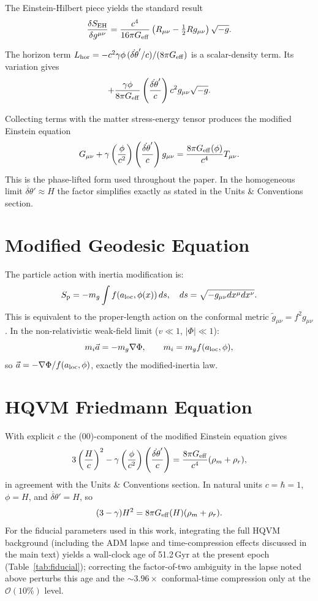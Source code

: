 \documentclass[12pt,a4paper]{article}
\begin{document}
The Einstein-Hilbert piece yields the standard result
\[
\frac{\delta S_{\rm EH}}{\delta g^{\mu\nu}} = \frac{c^4}{16\pi G_{\rm eff}} \left(R_{\mu\nu} - \tfrac12 R g_{\mu\nu}\right) \sqrt{-g}.
\]

The horizon term \(L_{\rm hor} = -c^2\gamma\phi\,(\dot{\delta\theta}'/c)/(8\pi G_{\rm eff})\) is a scalar-density term. Its variation gives
\[
+ \frac{\gamma \phi}{8\pi G_{\rm eff}} \left( \frac{\dot{\delta\theta}'}{c} \right) c^2 g_{\mu\nu} \sqrt{-g}.
\]

Collecting terms with the matter stress-energy tensor produces the modified Einstein equation
\[
G_{\mu\nu} + \gamma \left( \frac{\phi}{c^2} \right) \left( \frac{\dot{\delta\theta}'}{c} \right) g_{\mu\nu} = \frac{8\pi G_{\rm eff}(\phi)}{c^4} T_{\mu\nu}.
\]
This is the phase-lifted form used throughout the paper. In the homogeneous limit \(\dot{\delta\theta}' \approx H\) the factor simplifies exactly as stated in the Units \& Conventions section.

\section{Modified Geodesic Equation}

The particle action with inertia modification is:
\[
S_{\rm p} = -m_g \int f(a_{\rm loc},\phi(x)) \, ds, \quad ds = \sqrt{-g_{\mu\nu} dx^\mu dx^\nu}.
\]
This is equivalent to the proper-length action on the conformal metric $\tilde{g}_{\mu\nu} = f^2 g_{\mu\nu}$. In the non-relativistic weak-field limit ($v \ll 1$, $|\Phi| \ll 1$):
\[
m_i \vec{a} = -m_g \nabla\Phi, \qquad m_i = m_g f(a_{\rm loc},\phi),
\]
so $\vec{a} = -\nabla\Phi / f(a_{\rm loc},\phi)$, exactly the modified-inertia law.

\section{HQVM Friedmann Equation}

With explicit $c$ the (00)-component of the modified Einstein equation gives
\[
3\left(\frac{H}{c}\right)^2 - \gamma\left(\frac{\phi}{c^2}\right)\left(\frac{\dot{\delta\theta}'}{c}\right) = \frac{8\pi G_{\rm eff}}{c^4}(\rho_m + \rho_r),
\]
in agreement with the Units \& Conventions section. In natural units $c = \hbar = 1$, $\phi = H$, and $\dot{\delta\theta}' = H$, so
\[
(3-\gamma)H^2 = 8\pi G_{\rm eff}(H) (\rho_m + \rho_r).
\]
For the fiducial parameters used in this work, integrating the full HQVM background (including the ADM lapse and time-compression effects discussed in the main text) yields a wall-clock age of 51.2\,Gyr at the present epoch (Table~\ref{tab:fiducial}); correcting the factor-of-two ambiguity in the lapse noted above perturbs this age and the $\sim 3.96\times$ conformal-time compression only at the $\mathcal{O}(10\%)$ level.
\end{document}
